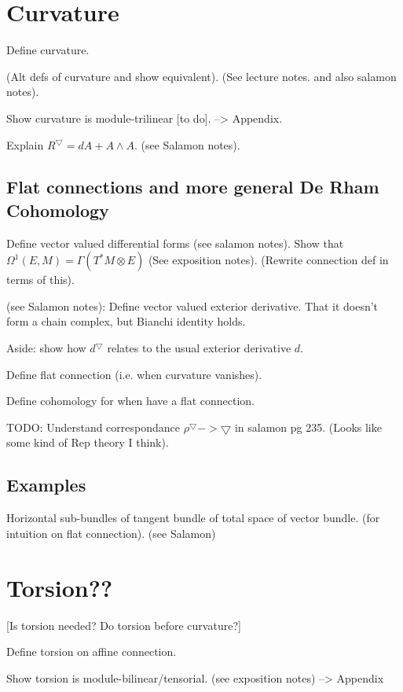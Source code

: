 \documentclass[a4paper]{article}
\theoremstyle{definition} \newtheorem*{definition}{Definition}
\theoremstyle{definition} \newtheorem*{definitions}{Definitions}
\theoremstyle{plain} \newtheorem{theorem}{Theorem}[section]
\theoremstyle{plain} \newtheorem{proposition}[theorem]{Proposition}
\theoremstyle{plain} \newtheorem{corollary}[theorem]{Corollary}
\theoremstyle{plain} \newtheorem{lemma}[theorem]{Lemma}
\theoremstyle{plain} \newtheorem{example}[theorem]{Example}
\begin{document}
\section{Curvature}

Define curvature. 

(Alt defs of curvature and show equivalent). (See  lecture notes. and also salamon notes).

Show curvature is module-trilinear [to do]. --> Appendix.

Explain $R^\bigtriangledown = dA + A\wedge A$. (see Salamon notes).

\subsection{Flat connections and more general De Rham Cohomology}

Define vector valued differential forms (see salamon notes). 
Show that $\Omega^1 (E, M) = \Gamma (T^*M\otimes E)$ (See exposition notes). 
(Rewrite connection def in terms of this).

(see Salamon notes):
Define vector valued exterior derivative. That it doesn't form a chain complex, but Bianchi identity holds. 

Aside: show how $d^\bigtriangledown$ relates to the usual exterior derivative $d$.

Define flat connection (i.e. when curvature vanishes).

Define cohomology for when have a flat connection.

TODO: Understand correspondance $\rho^\bigtriangledown -> \bigtriangledown$ in salamon pg 235. (Looks like some kind of Rep theory I think).

\subsection{Examples}

Horizontal sub-bundles of tangent bundle of total space of vector bundle. (for intuition on flat connection). (see Salamon)



\section{Torsion??}
[Is torsion needed? Do torsion before curvature?]

Define torsion on affine connection. 

Show torsion is module-bilinear/tensorial. (see exposition notes) --> Appendix
\end{document}
